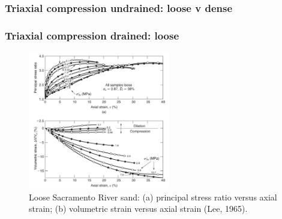 \documentclass[notes]{beamer}
\begin{document}
\begin{frame}
\frametitle{Triaxial compression undrained: loose v dense}
\end{frame}

\begin{frame}
\frametitle{Triaxial compression drained: loose}
\begin{figure}
	\includegraphics[width=0.55\textwidth]{figs/tx-drained-loose.png}
	\caption*{Loose Sacramento River sand: (a) principal stress ratio versus
		axial strain; (b) volumetric strain versus axial strain (Lee, 1965).}
\end{figure}
\end{frame}
\end{document}
